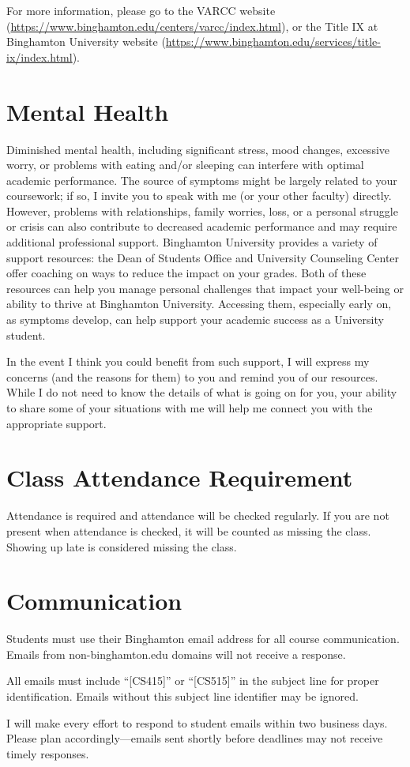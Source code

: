 \documentclass[11pt,article,oneside]{memoir} %
\begin{document}
For more information, please go to the VARCC website (\url{https://www.binghamton.edu/centers/varcc/index.html}), or the Title IX at Binghamton University website (\url{https://www.binghamton.edu/services/title-ix/index.html}).

\section{Mental Health}

Diminished mental health, including significant stress, mood changes, excessive worry, or problems with eating and/or sleeping can interfere with optimal academic performance.
The source of symptoms might be largely related to your coursework; if so, I invite you to speak with me (or your other faculty) directly.
However, problems with relationships, family worries, loss, or a personal struggle or crisis can also contribute to decreased academic performance and may require additional professional support.
Binghamton University provides a variety of support resources: the Dean of Students Office and University Counseling Center offer coaching on ways to reduce the impact on your grades.
Both of these resources can help you manage personal challenges that impact your well-being or ability to thrive at Binghamton University.
Accessing them, especially early on, as symptoms develop, can help support your academic success as a University student.

In the event I think you could benefit from such support, I will express my concerns (and the reasons for them) to you and remind you of our resources.
While I do not need to know the details of what is going on for you, your ability to share some of your situations with me will help me connect you with the appropriate support.

\section{Class Attendance Requirement}

Attendance is required and attendance will be checked regularly.
If you are not present when attendance is checked, it will be counted as missing the class.
Showing up late is considered missing the class.

\section{Communication}

Students must use their Binghamton email address for all course communication.
Emails from non-binghamton.edu domains will not receive a response.

All emails must include ``[CS415]'' or ``[CS515]'' in the subject line for proper identification.
Emails without this subject line identifier may be ignored.

I will make every effort to respond to student emails within two business days.
Please plan accordingly—emails sent shortly before deadlines may not receive timely responses.
\end{document}
